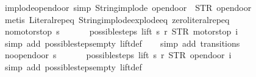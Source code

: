 \begin{isabellebody}
\endisatagproof
{\isafoldproof}%
%
\isadelimproof
\isanewline
%
\endisadelimproof
\isanewline
{}\isamarkupfalse%
\ implode{\isacharunderscore}opendoor\ {\isacharbrackleft}simp{\isacharbrackright}{\isacharcolon}\ {\isachardoublequoteopen}String{\isachardot}implode\ {\isacharprime}{\isacharprime}opendoor{\isacharprime}{\isacharprime}\ {\isacharequal}\ STR\ {\isacharprime}{\isacharprime}opendoor{\isacharprime}{\isacharprime}{\isachardoublequoteclose}\isanewline
%
\isadelimproof
\ \ %
\endisadelimproof
%
\isatagproof
{}\isamarkupfalse%
\ {\isacharparenleft}metis\ Literal{\isachardot}rep{\isacharunderscore}eq\ String{\isachardot}implode{\isacharunderscore}explode{\isacharunderscore}eq\ zero{\isacharunderscore}literal{\isachardot}rep{\isacharunderscore}eq{\isacharparenright}%
\endisatagproof
{\isafoldproof}%
%
\isadelimproof
\isanewline
%
\endisadelimproof
\isanewline
{}\isamarkupfalse%
\ no{\isacharunderscore}motor{\isacharunderscore}stop{\isacharcolon}\ {\isachardoublequoteopen}s\ {\isasymnotin}\ {\isacharbraceleft}{}{\isacharcomma}\ {}{\isacharcomma}\ {}{\isacharcomma}\ {}{\isacharbraceright}\ {\isasymLongrightarrow}\ possible{\isacharunderscore}steps\ lift\ s\ r\ STR\ {\isacharprime}{\isacharprime}motorstop{\isacharprime}{\isacharprime}\ i\ {\isacharequal}\ {\isacharbraceleft}{\isacharbar}{\isacharbar}{\isacharbraceright}{\isachardoublequoteclose}\isanewline
%
\isadelimproof
\ \ %
\endisadelimproof
%
\isatagproof
{}\isamarkupfalse%
\ {\isacharparenleft}simp\ add{\isacharcolon}\ possible{\isacharunderscore}steps{\isacharunderscore}empty\ lift{\isacharunderscore}def{\isacharparenright}\isanewline
\ \ \isamarkupfalse%
\ {\isacharparenleft}simp\ add{\isacharcolon}\ transitions{\isacharparenright}%
\endisatagproof
{\isafoldproof}%
%
\isadelimproof
\isanewline
%
\endisadelimproof
\isanewline
{}\isamarkupfalse%
\ no{\isacharunderscore}open{\isacharunderscore}door{\isacharcolon}\ {\isachardoublequoteopen}s\ {\isasymnotin}\ {\isacharbraceleft}{}{\isacharcomma}\ {}{\isacharcomma}\ {}{\isacharcomma}\ {}{\isacharbraceright}\ {\isasymLongrightarrow}\ possible{\isacharunderscore}steps\ lift\ s\ r\ STR\ {\isacharprime}{\isacharprime}opendoor{\isacharprime}{\isacharprime}\ i\ {\isacharequal}\ {\isacharbraceleft}{\isacharbar}{\isacharbar}{\isacharbraceright}{\isachardoublequoteclose}\isanewline
%
\isadelimproof
\ \ %
\endisadelimproof
%
\isatagproof
{}\isamarkupfalse%
\ {\isacharparenleft}simp\ add{\isacharcolon}\ possible{\isacharunderscore}steps{\isacharunderscore}empty\ lift{\isacharunderscore}def{\isacharparenright}\isanewline

\end{isabellebody}

